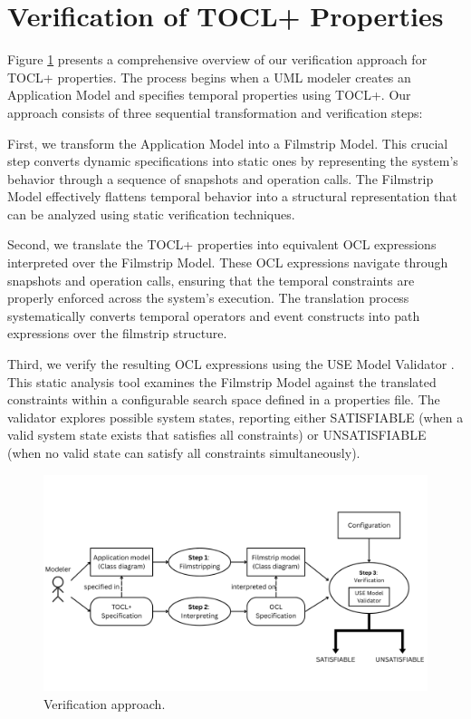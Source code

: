 \section{Verification of TOCL+ Properties}

\hspace{1cm} Figure \ref{sec:verification_approach} presents a comprehensive overview 
of our verification approach for TOCL+ properties. The process begins when a UML 
modeler creates an Application Model and specifies temporal properties using TOCL+. 
Our approach consists of three sequential transformation and verification steps:

First, we transform the Application Model into a Filmstrip Model. This crucial step 
converts dynamic specifications into static ones by representing the system's behavior 
through a sequence of snapshots and operation calls. The Filmstrip Model effectively 
flattens temporal behavior into a structural representation that can be analyzed 
using static verification techniques.

Second, we translate the TOCL+ properties into equivalent OCL expressions interpreted 
over the Filmstrip Model. These OCL expressions navigate through snapshots and 
operation calls, ensuring that the temporal constraints are properly enforced across 
the system's execution. The translation process systematically converts temporal 
operators and event constructs into path expressions over the filmstrip structure.

Third, we verify the resulting OCL expressions using the USE Model Validator 
\cite{USE_Validator}. This static analysis tool examines the Filmstrip Model against 
the translated constraints within a configurable search space defined in a properties 
file. The validator explores possible system states, reporting either SATISFIABLE 
(when a valid system state exists that satisfies all constraints) or UNSATISFIABLE 
(when no valid state can satisfy all constraints simultaneously).

\begin{figure}
    \centering
    \includegraphics[width=1\textwidth]{figures/c2/Verification_approach_1.png}
    \caption{Verification approach.}
    \label{sec:verification_approach}
\end{figure}


